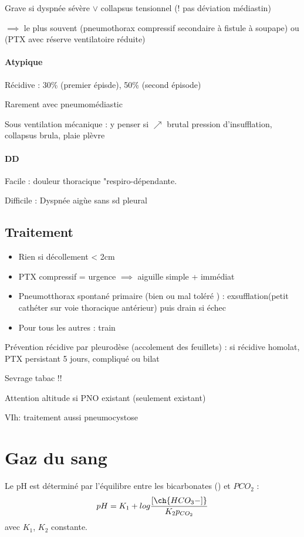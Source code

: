 \documentclass{article}
\begin{document}
Grave si dyspnée sévère $\vee$ collapsus tensionnel (! pas déviation médiastin) 

$\implies$ le plus souvent (pneumothorax compressif secondaire à fistule à
soupape) ou (PTX avec réserve ventilatoire réduite)

\paragraph{Atypique}
Récidive : 30\% (premier épisde), 50\% (second épisode)

Rarement avec pneumomédiastic

Sous ventilation mécanique : y penser si $\nearrow$ brutal pression
d'insufflation, collapsus brula, plaie plèvre

\paragraph{DD}
Facile : douleur thoracique "respiro-dépendante.

Difficile : Dyspnée aigùe sans sd pleural 

\subsection{Traitement}
\begin{itemize}
  \item Rien si décollement < 2cm
  \item PTX compressif = urgence $\implies$ aiguille simple + immédiat
  \item Pneumotthorax spontané primaire (bien ou mal toléré ) :
    exsufflation(petit cathéter sur voie thoracique antérieur) puis drain
si échec
\item Pour tous les autres : train
\end{itemize}

Prévention récidive par pleurodèse (accolement des feuillets) : si récidive
homolat, PTX persistant 5 jours, compliqué ou bilat

Sevrage tabac !!

Attention altitude si PNO existant (seulement existant)

VIh: traitement aussi pneumocystose


\section{Gaz du sang}
\label{appendix:gds}
Le pH est déterminé par l'équilibre entre les bicarbonates () et
$PCO_2$ :
\begin{equation}
  pH = K_1 + log\frac{[\ch{HCO_3-]}}{K_2 p_{CO_2}}
\end{equation}
avec $K_1$, $K_2$ constante.
\end{document}
